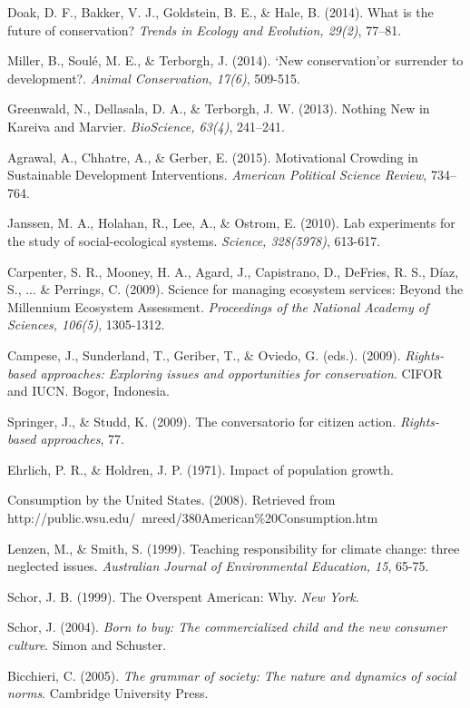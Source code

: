 \documentclass[rutwik_proposal.tex]{subfiles}
\begin{document}
\begin{thebibliography}{100}
Doak, D. F., Bakker, V. J., Goldstein, B. E., \& Hale, B. 
(2014). 
What is the future of conservation? 
\emph{Trends in Ecology and Evolution, 29(2)}, 
77–81.

Miller, B., Soulé, M. E., \& Terborgh, J. 
(2014). 
‘New conservation’or surrender to development?. 
\emph{Animal Conservation, 17(6)}, 
509-515.

Greenwald, N., Dellasala, D. A., \& Terborgh, J. W. 
(2013). 
Nothing New in Kareiva and Marvier. 
\emph{BioScience, 63(4)}, 
241–241.

Agrawal, A., Chhatre, A., \& Gerber, E. 
(2015). 
Motivational Crowding in Sustainable Development Interventions. 
\emph{American Political Science Review}, 
734–764.

Janssen, M. A., Holahan, R., Lee, A., \& Ostrom, E. 
(2010). 
Lab experiments for the study of social-ecological systems. 
\emph{Science, 328(5978)}, 
613-617.

Carpenter, S. R., Mooney, H. A., Agard, J., Capistrano, D., DeFries, R. S., Díaz, S., ... \& Perrings, C. 
(2009). 
Science for managing ecosystem services: Beyond the Millennium Ecosystem Assessment. 
\emph{Proceedings of the National Academy of Sciences, 106(5)}, 
1305-1312.

Campese, J., Sunderland, T., Geriber, T., \& Oviedo, G. (eds.).
(2009).
\emph{Rights-based approaches: Exploring issues and opportunities for conservation}.
CIFOR and IUCN.
Bogor, Indonesia.

Springer, J., \& Studd, K. 
(2009). 
The conversatorio for citizen action. 
\emph{Rights-based approaches}, 
77.

Ehrlich, P. R., \& Holdren, J. P. 
(1971). 
Impact of population growth.

Consumption by the United States.
(2008).
Retrieved from \\http://public.wsu.edu/~mreed/380American\%20Consumption.htm

Lenzen, M., \& Smith, S. 
(1999). 
Teaching responsibility for climate change: three neglected issues. 
\emph{Australian Journal of Environmental Education, 15}, 
65-75.

Schor, J. B. 
(1999). 
The Overspent American: Why. 
\emph{New York}.

Schor, J. 
(2004). 
\emph{Born to buy: The commercialized child and the new consumer culture}. 
Simon and Schuster.

Bicchieri, C. 
(2005). 
\emph{The grammar of society: The nature and dynamics of social norms}. 
Cambridge University Press.



\end{thebibliography}
\end{document}
